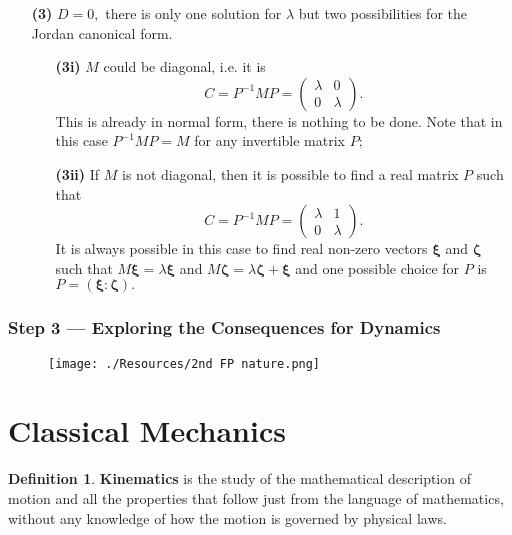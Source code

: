 \documentclass[12pt, a4paper]{article}
\theoremstyle{definition}
\newtheorem{definition}{Definition}[section]
\theoremstyle{plain}
\begin{document}
\begin{enumerate}
	\item[\textbf{(3)}] $D = 0,$ there is only one solution for $\lambda$ but two possibilities for the Jordan canonical form. \begin{enumerate}
		
		\item[\textbf{(3i)}] $M$ could be diagonal, i.e. it is $$C=P^{-1}MP=\begin{pmatrix} \lambda &0 \\ 0&\lambda \end{pmatrix}.$$ This is already in normal form, there is nothing to be done. Note that in this case $P^{-1}MP = M$ for any invertible matrix $P;$

		\item[\textbf{(3ii)}] If $M$ is not diagonal, then it is possible to find a real matrix $P$ such that $$C=P^{-1}MP=\begin{pmatrix} \lambda &1 \\ 0&\lambda \end{pmatrix}.$$ It is always possible in this case to find real non-zero vectors $\bm{\xi}$ and $\bm{\zeta}$ such that $M\bm{\xi}= \lambda\bm{\xi}$ and $M\bm{\zeta} = \lambda\bm{\zeta}  + \bm{\xi}$ and one possible choice for $P$ is $P = (\bm{\xi} : \bm{\zeta}).$

	
	\end{enumerate}

\end{enumerate}

\subsubsection*{Step 3 — Exploring the Consequences for Dynamics}

\begin{figure}[H]
\centering
\texttt{[image: ./Resources/2nd FP nature.png]}
\end{figure}

\section{Classical Mechanics}

\begin{definition}
\textbf{Kinematics} is the study of the mathematical description of motion and all the properties that follow just from the language of mathematics, without any knowledge of how the motion is governed by physical laws.
\end{definition}
\end{document}
